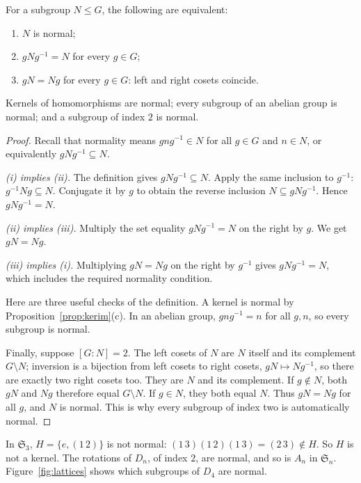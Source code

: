 \begin{proposition}\label{prop:normal}
For a subgroup $N\le G$, the following are equivalent:
\begin{enumerate}[label=(\roman*)]
\item $N$ is normal;
\item $gNg^{-1}=N$ for every $g\in G$;
\item $gN=Ng$ for every $g\in G$: left and right cosets coincide.
\end{enumerate}
Kernels of homomorphisms are normal; every subgroup of an abelian group is normal; and a subgroup of index $2$ is normal.
\end{proposition}
\begin{proof}
Recall that normality means $gng^{-1}\in N$
for all $g\in G$ and $n\in N$, or equivalently
$gNg^{-1}\subseteq N$.

\emph{(i) implies (ii).}
The definition gives $gNg^{-1}\subseteq N$.
Apply the same inclusion to $g^{-1}$:
$g^{-1}Ng\subseteq N$. Conjugate it by $g$
to obtain the reverse inclusion
$N\subseteq gNg^{-1}$. Hence $gNg^{-1}=N$.

\emph{(ii) implies (iii).}
Multiply the set equality $gNg^{-1}=N$
on the right by $g$. We get $gN=Ng$.

\emph{(iii) implies (i).}
Multiplying $gN=Ng$ on the right by $g^{-1}$
gives $gNg^{-1}=N$, which includes the
required normality condition.

Here are three useful checks of the definition.
A kernel is normal by Proposition~\ref{prop:kerim}(c).
In an abelian group, $gng^{-1}=n$ for all
$g,n$, so every subgroup is normal.

Finally, suppose $[G:N]=2$. The left cosets of $N$
are $N$ itself and its complement $G\setminus N$;
inversion is a bijection from left cosets to right cosets,
$gN\mapsto Ng^{-1}$, so there are exactly two right cosets too.
They are $N$ and its complement.
If $g\notin N$, both $gN$ and $Ng$ therefore
equal $G\setminus N$. If $g\in N$, they both
equal $N$. Thus $gN=Ng$ for all $g$, and
$N$ is normal. This is why every subgroup
of index two is automatically normal.
\end{proof}

In $\mathfrak S_3$, $H=\{e,(1\,2)\}$ is not normal: $(1\,3)(1\,2)(1\,3)=(2\,3)\notin H$. So $H$ is not a kernel. The rotations of $D_n$, of index $2$, are normal, and so is $A_n$ in $\mathfrak S_n$. Figure~\ref{fig:lattices} shows which subgroups of $D_4$ are normal.


